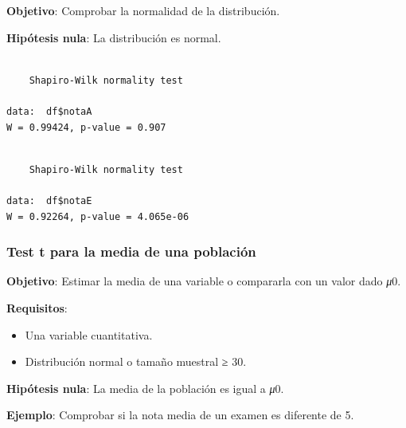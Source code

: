 \documentclass[
  a4paper,
]{scrreport}
\newenvironment{Shaded}{\begin{snugshade}}{\end{snugshade}}
\newcommand{\FunctionTok}[1]{\textcolor[rgb]{0.28,0.35,0.67}{#1}}
\newcommand{\NormalTok}[1]{\textcolor[rgb]{0.00,0.23,0.31}{#1}}
\newcommand{\SpecialCharTok}[1]{\textcolor[rgb]{0.37,0.37,0.37}{#1}}
\providecommand{\tightlist}{%
  \setlength{\itemsep}{0pt}\setlength{\parskip}{0pt}}\usepackage{longtable,booktabs,array}
\theoremstyle{definition}
\theoremstyle{definition}
\theoremstyle{remark}
\begin{document}
\textbf{Objetivo}: Comprobar la normalidad de la distribución.

\textbf{Hipótesis nula}: La distribución es normal.

\begin{Shaded}
\end{Shaded}

\begin{verbatim}

    Shapiro-Wilk normality test

data:  df$notaA
W = 0.99424, p-value = 0.907
\end{verbatim}

\begin{Shaded}
\end{Shaded}

\begin{verbatim}

    Shapiro-Wilk normality test

data:  df$notaE
W = 0.92264, p-value = 4.065e-06
\end{verbatim}

\hypertarget{test-t-para-la-media-de-una-poblaciuxf3n}{%
\subsubsection{Test t para la media de una
población}\label{test-t-para-la-media-de-una-poblaciuxf3n}}

\textbf{Objetivo}: Estimar la media de una variable o compararla con un
valor dado \emph{μ}0.

\textbf{Requisitos}:

\begin{itemize}
\tightlist
\item
  Una variable cuantitativa.
\item
  Distribución normal o tamaño muestral ≥ 30.
\end{itemize}

\textbf{Hipótesis nula}: La media de la población es igual a \emph{μ}0.

\textbf{Ejemplo}: Comprobar si la nota media de un examen es diferente
de 5.
\end{document}
